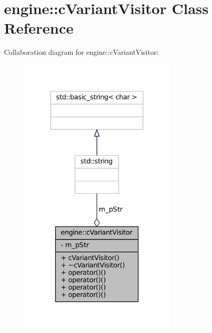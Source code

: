 \hypertarget{classengine_1_1cVariantVisitor}{
\section{engine\-:\-:c\-Variant\-Visitor \-Class \-Reference}
\label{classengine_1_1cVariantVisitor}
}


\-Collaboration diagram for engine\-:\-:c\-Variant\-Visitor\-:\nopagebreak
\begin{figure}[H]
\begin{center}
\leavevmode
\includegraphics[width=218pt]{classengine_1_1cVariantVisitor__coll__graph}
\end{center}
\end{figure}
